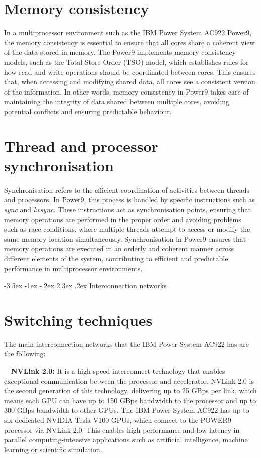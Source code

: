 \documentclass{report}
\makeatletter
\renewcommand\chapter{\@startsection{chapter}{0}{\z@}%
    {-3.5ex \@plus -1ex \@minus -.2ex}%
    {2.3ex \@plus.2ex}%
    {\normalfont\Large\bfseries}}
\makeatother
\begin{document}
\section{Memory consistency}
In a multiprocessor environment such as the IBM Power System AC922 Power9, the memory consistency is essential to
ensure that all cores share a coherent view of the data stored in memory. The Power9 implements memory consistency
models, such as the Total Store Order (TSO) model, which establishes rules for how read and write operations should
be coordinated between cores. This ensures that, when accessing and modifying shared data, all cores see a consistent
version of the information. In other words, memory consistency in Power9 takes care of maintaining the integrity of
data shared between multiple cores, avoiding potential conflicts and ensuring predictable behaviour.

\cleardoublepage

\section{Thread and processor synchronisation}
Synchronisation refers to the efficient coordination of activities between threads and processors. In Power9, this
process is handled by specific instructions such as \emph{sync} and \emph{lwsync}. These instructions act as
synchronisation points, ensuring that memory operations are performed in the proper order and avoiding problems such
as race conditions, where multiple threads attempt to access or modify the same memory location simultaneously.
Synchronisation in Power9 ensures that memory operations are executed in an orderly and coherent manner across 
different elements of the system, contributing to efficient and predictable performance in multiprocessor environments.

\chapter{Interconnection networks}
\section{Switching techniques}
The main interconnection networks that the IBM Power System AC922 has are the following:

\setlength{\parindent}{1em}
\CIRCLE \ \ \textbf{NVLink 2.0:} It is a high-speed interconnect technology that enables exceptional communication between 
the processor and accelerator. NVLink 2.0 is the second generation of this technology, delivering up to 25 GBps per 
link, which means each GPU can have up to 150 GBps bandwidth to the processor and up to 300 GBps bandwidth to other
GPUs. The IBM Power System AC922 has up to six dedicated NVIDIA Tesla V100 GPUs, which connect to the POWER9 processor
via NVLink 2.0. This enables high performance and low latency in parallel computing-intensive applications such as 
artificial intelligence, machine learning or scientific simulation.
\end{document}
